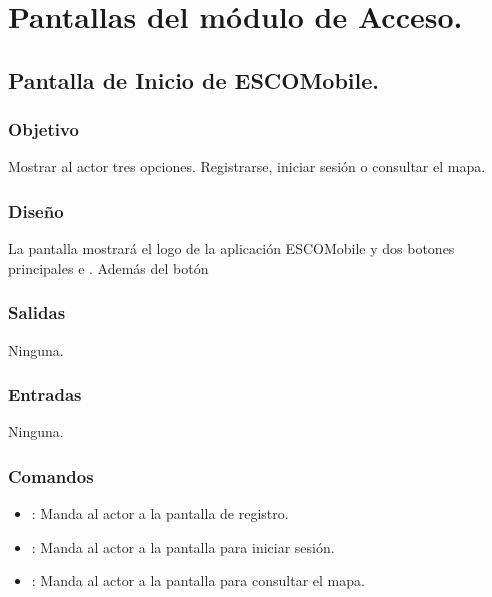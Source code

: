 \section{Pantallas del módulo de Acceso.}


\subsection{Pantalla de Inicio de ESCOMobile.}

\subsubsection{Objetivo}
	\noindent
	Mostrar al actor tres opciones. Registrarse, iniciar sesión o consultar el mapa.

\subsubsection{Diseño}
	\noindent
	La pantalla mostrará el logo de la aplicación ESCOMobile y dos botones principales  e .
	Además del botón  


\subsubsection{Salidas}
	\noindent
	Ninguna.

\subsubsection{Entradas}
	\noindent
	Ninguna.

\subsubsection{Comandos}
	\begin{itemize}
		\item {}: Manda al actor a la pantalla de registro.
		\item {}: Manda al actor a la pantalla para iniciar sesión.
		\item {}: Manda al actor a la pantalla para consultar el mapa.
	\end{itemize}

